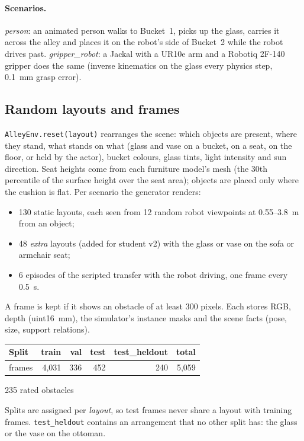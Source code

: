 \documentclass[10pt,a4paper]{article}
\newcommand{\code}[1]{\texttt{#1}}
\begin{document}
\paragraph{Scenarios.} \emph{person}: an animated person walks to Bucket~1, picks up the glass, carries it across the alley and
places it on the robot's side of Bucket~2 while the robot drives past. \emph{gripper\_robot}: a Jackal with a UR10e arm and a
Robotiq 2F-140 gripper does the same (inverse kinematics on the glass every physics step, 0.1~mm grasp error).

\subsection{Random layouts and frames}
\code{AlleyEnv.reset(layout)} rearranges the scene: which objects are present, where they stand, what stands on what (glass and
vase on a bucket, on a seat, on the floor, or held by the actor), bucket colours, glass tints, light intensity and sun
direction. Seat heights come from each furniture model's mesh (the 30th percentile of the surface height over the seat area);
objects are placed only where the cushion is flat. Per scenario the generator renders:
\begin{itemize}
\item 130 static layouts, each seen from 12 random robot viewpoints at 0.55--3.8~m from an object;
\item 48 \emph{extra} layouts (added for student v2) with the glass or vase on the sofa or armchair seat;
\item 6 episodes of the scripted transfer with the robot driving, one frame every 0.5~s.
\end{itemize}
A frame is kept if it shows an obstacle of at least 300 pixels. Each stores RGB, depth (uint16~mm), the simulator's instance
masks and the scene facts (pose, size, support relations).

\begin{center}\small
\begin{tabular}{lrrrrr}
\toprule
Split & train & val & test & test\_heldout & total \\
\midrule
frames & 4{,}031 & 336 & 452 & 240 & 5{,}059 \\
\bottomrule
\end{tabular}
235 rated obstacles
\end{center}
Splits are assigned per \emph{layout}, so test frames never share a layout with training frames. \code{test\_heldout} contains an
arrangement that no other split has: the glass or the vase on the ottoman.
\end{document}

